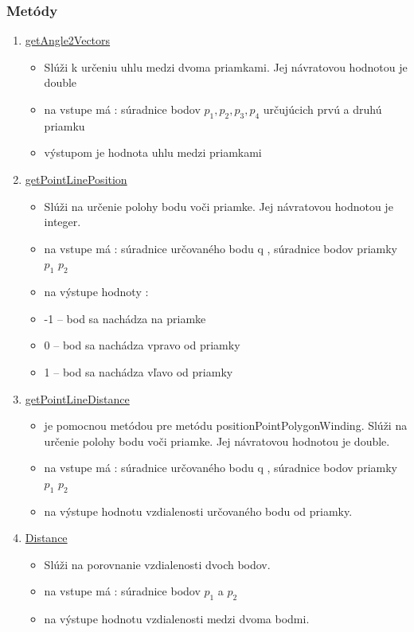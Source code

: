 \documentclass[12pt]{article}
\begin{document}
\subsubsection{Metódy}

\begin{enumerate}
\item[] \underline{getAngle2Vectors}
\begin{itemize}
\item Slúži k určeniu uhlu medzi dvoma priamkami. Jej návratovou hodnotou je double
\item na vstupe má : súradnice bodov $p_1, p_2, p_3, p_4$ určujúcich prvú a druhú priamku
\item výstupom je hodnota uhlu medzi priamkami 
\end{itemize}

\item[] \underline{getPointLinePosition}
\begin{itemize}
\item Slúži na určenie polohy bodu voči priamke. Jej návratovou hodnotou je integer.
\item na vstupe má : súradnice určovaného bodu q , súradnice bodov priamky $p_1$ $p_2$
\item na výstupe hodnoty :
\item[] -1 – bod sa nachádza na priamke
\item[] 0 – bod sa nachádza vpravo od priamky
\item[] 1 – bod sa nachádza vľavo od priamky
\end{itemize}

\item[] \underline{getPointLineDistance}
\begin{itemize}
\item je pomocnou metódou pre metódu positionPointPolygonWinding. Slúži na určenie polohy bodu voči priamke. Jej návratovou hodnotou je double.
\item na vstupe má : súradnice určovaného bodu q , súradnice bodov priamky $p_1$ $p_2$
\item na výstupe hodnotu vzdialenosti určovaného bodu od priamky.
\end{itemize}

\item[] \underline{Distance}
\begin{itemize}
\item Slúži na porovnanie vzdialenosti dvoch bodov. 
\item na vstupe má : súradnice bodov  $p_1$  a $p_2$
\item na výstupe hodnotu vzdialenosti medzi dvoma bodmi.
\end{itemize}


\end{enumerate}
\end{document}
